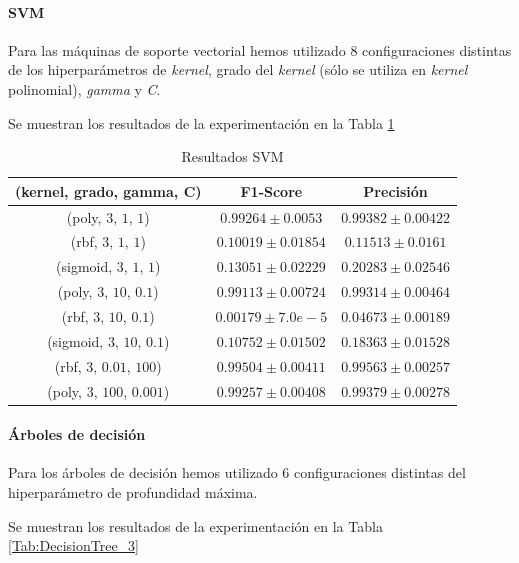\documentclass[12pt]{article}
\begin{document}
\paragraph{SVM}

Para las máquinas de soporte vectorial hemos utilizado 8 configuraciones distintas de los hiperparámetros de \textit{kernel},
grado del \textit{kernel} (sólo se utiliza en \textit{kernel} polinomial), \textit{gamma} y \textit{C}.

Se muestran los resultados de la experimentación en la Tabla \ref{Tab:SVM_3}

\begin{table}[!ht]
	\caption{Resultados SVM}
	\centering
		 \begin{tabular}{||c c c||}
			 \hline
			 (kernel, grado, gamma, C) & F1-Score & Precisión  \\ [0.5ex]
			 \hline\hline
			 (poly, $3$, $1$, $1$) & $0.99264 \pm 0.0053$ & $0.99382 \pm 0.00422$ \\
			\hline
			(rbf, $3$, $1$, $1$) & $0.10019 \pm 0.01854$ & $0.11513 \pm 0.0161$ \\
			\hline
			(sigmoid, $3$, $1$, $1$) & $0.13051 \pm 0.02229$ & $0.20283 \pm 0.02546$ \\
			\hline
			(poly, $3$, $10$, $0.1$) & $0.99113 \pm 0.00724$ & $0.99314 \pm 0.00464$ \\
			\hline
			(rbf, $3$, $10$, $0.1$) & $0.00179 \pm 7.0e-5$ & $0.04673 \pm 0.00189$ \\
			\hline
			(sigmoid, $3$, $10$, $0.1$) & $0.10752 \pm 0.01502$ & $0.18363 \pm 0.01528$ \\
			\hline
			(rbf, $3$, $0.01$, $100$) & $0.99504 \pm 0.00411$ & $0.99563 \pm 0.00257$ \\
			\hline
			(poly, $3$, $100$, $0.001$) & $0.99257 \pm 0.00408$ & $0.99379 \pm 0.00278$ \\
			\hline
		 \end{tabular}
	\label{Tab:SVM_3}
	\end{table}

\paragraph{Árboles de decisión}
Para los árboles de decisión hemos utilizado 6 configuraciones distintas del hiperparámetro de profundidad máxima.

Se muestran los resultados de la experimentación en la Tabla \ref{Tab:DecisionTree_3}
\end{document}
